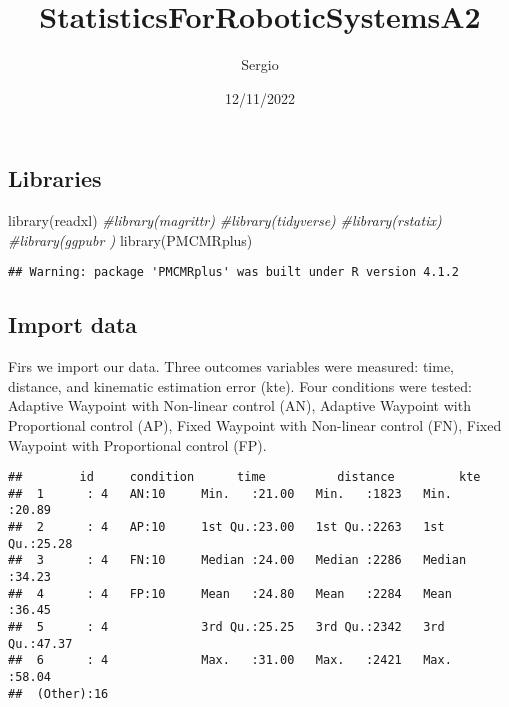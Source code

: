 \documentclass[
]{article}
\title{StatisticsForRoboticSystemsA2}
\author{Sergio}
\date{12/11/2022}
\newenvironment{Shaded}{\begin{snugshade}}{\end{snugshade}}
\newcommand{\CommentTok}[1]{\textcolor[rgb]{0.56,0.35,0.01}{\textit{#1}}}
\newcommand{\FunctionTok}[1]{\textcolor[rgb]{0.00,0.00,0.00}{#1}}
\newcommand{\NormalTok}[1]{#1}
\newcommand{\OtherTok}[1]{\textcolor[rgb]{0.56,0.35,0.01}{#1}}
\newcommand{\SpecialCharTok}[1]{\textcolor[rgb]{0.00,0.00,0.00}{#1}}
\newcommand{\StringTok}[1]{\textcolor[rgb]{0.31,0.60,0.02}{#1}}
\begin{document}
\maketitle

\hypertarget{libraries}{%
\subsection{Libraries}\label{libraries}}

\begin{Shaded}
\begin{Highlighting}[]
\FunctionTok{library}\NormalTok{(readxl)}
\CommentTok{\#library(magrittr)}
\CommentTok{\#library(tidyverse)}
\CommentTok{\#library(rstatix)}
\CommentTok{\#library(ggpubr )}
\FunctionTok{library}\NormalTok{(PMCMRplus)}
\end{Highlighting}
\end{Shaded}

\begin{verbatim}
## Warning: package 'PMCMRplus' was built under R version 4.1.2
\end{verbatim}

\hypertarget{import-data}{%
\subsection{Import data}\label{import-data}}

Firs we import our data. Three outcomes variables were measured: time,
distance, and kinematic estimation error (kte). Four conditions were
tested: Adaptive Waypoint with Non-linear control (AN), Adaptive
Waypoint with Proportional control (AP), Fixed Waypoint with Non-linear
control (FN), Fixed Waypoint with Proportional control (FP).

\begin{Shaded}
\end{Shaded}

\begin{verbatim}
##        id     condition      time          distance         kte       
##  1      : 4   AN:10     Min.   :21.00   Min.   :1823   Min.   :20.89  
##  2      : 4   AP:10     1st Qu.:23.00   1st Qu.:2263   1st Qu.:25.28  
##  3      : 4   FN:10     Median :24.00   Median :2286   Median :34.23  
##  4      : 4   FP:10     Mean   :24.80   Mean   :2284   Mean   :36.45  
##  5      : 4             3rd Qu.:25.25   3rd Qu.:2342   3rd Qu.:47.37  
##  6      : 4             Max.   :31.00   Max.   :2421   Max.   :58.04  
##  (Other):16
\end{verbatim}
\end{document}
